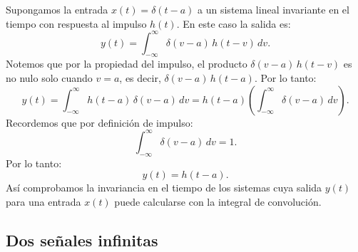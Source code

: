 \documentclass[11pt,a4paper,openany]{book}
\begin{document}
Supongamos la entrada $x(t) = \delta(t-a)$ a un sistema lineal invariante en el tiempo con respuesta al impulso $h(t)$. En este caso la salida es:
\begin{equation}
	y(t) = \int_{-\infty}^{\infty} \delta(v - a) \, h(t - v) \, dv.
\end{equation}
Notemos que por la propiedad del impulso, el producto $\delta(v - a) \, h(t - v)$ es no nulo solo cuando $v = a$, es decir, $\delta(v - a) \, h(t - a)$. Por lo tanto:
\begin{equation}
	y(t) = \int_{-\infty}^{\infty} h(t - a) \, \delta(v - a ) \, dv = h(t - a) \left( \int_{-\infty}^{\infty} \delta(v - a ) \, dv \right).
\end{equation}
Recordemos que por definición de impulso:
\begin{equation}
	\int_{-\infty}^{\infty} \delta(v - a ) \, dv = 1.
\end{equation}
Por lo tanto:
\begin{equation}
	y(t) = h(t - a).
\end{equation}
Así comprobamos la invariancia en el tiempo de los sistemas cuya salida $y(t)$ para una entrada $x(t)$ puede calcularse con la integral de convolución.

\subsection{Dos señales infinitas}
\end{document}
